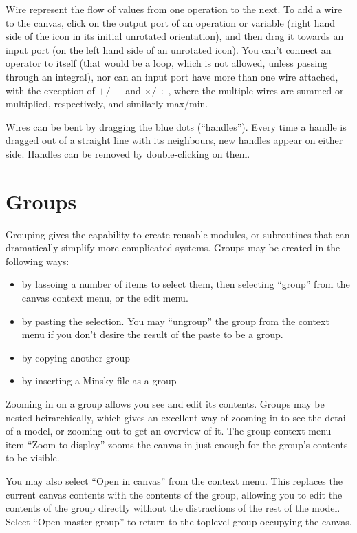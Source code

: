 Wire represent the flow of values from one operation to the next. To
add a wire to the canvas, click on the output port of an operation or
variable (right hand side of the icon in its initial unrotated
orientation), and then drag it towards an input port (on the left hand
side of an unrotated icon). You can't connect an operator to itself
(that would be a loop, which is not allowed, unless passing through an
integral), nor can an input port have more than one wire
attached, with the exception of $+/-$ and $\times/\div$, where the
multiple wires are summed or multiplied, respectively, and similarly max/min.

Wires can be bent by dragging the blue dots (``handles''). Every time
a handle is dragged out of a straight line with its neighbours, new
handles appear on either side. Handles can be removed by
double-clicking on them.

\section{Groups}\label{Group}

Grouping gives the capability to create reusable modules, or subroutines that
can dramatically simplify more complicated systems. Groups may be
created in the following ways:
\begin{itemize}
\item by lassoing a number of items to select them, then selecting
``group'' from the canvas context menu, or the edit menu.
\item by pasting the selection. You may ``ungroup'' the group from the
context menu if you don't desire the result of the paste to be a group.
\item by copying another group
\item by inserting a Minsky file as a group
\end{itemize}

Zooming in on a group allows you see and edit its contents. Groups may
be nested heirarchically, which gives an excellent way of zooming in
to see the detail of a model, or zooming out to get an overview of
it. The group context menu item ``Zoom to display'' zooms the canvas
in just enough for the group's contents to be visible.

You may also select ``Open in canvas'' from the context menu. This
replaces the current canvas contents with the contents of the group,
allowing you to edit the contents of the group directly without the
distractions of the rest of the model. Select ``Open master group'' to
return to the toplevel group occupying the canvas.

